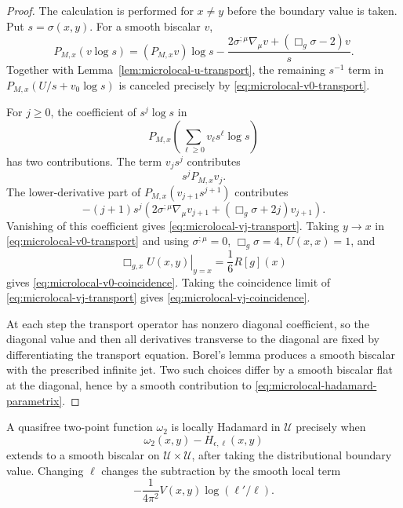 \begin{proof}
The calculation is performed for \(x\neq y\) before the boundary value is
taken.  Put \(s=\sigma(x,y)\).  For a smooth biscalar \(v\),
\begin{equation}
  P_{M,x}(v\log s)
  =
  (P_{M,x}v)\log s
  -
  \frac{
  2\sigma^{;\mu}\nabla_\mu v+(\Box_g\sigma-2)v
  }{s}.
  \label{eq:microlocal-p-v-log}
\end{equation}
Together with Lemma~\ref{lem:microlocal-u-transport}, the remaining
\(s^{-1}\) term in \(P_{M,x}(U/s+v_0\log s)\) is canceled precisely by
\eqref{eq:microlocal-v0-transport}.

For \(j\geq0\), the coefficient of \(s^j\log s\) in
\[
  P_{M,x}\left(\sum_{\ell\geq0}v_\ell s^\ell\log s\right)
\]
has two contributions.  The term \(v_j s^j\) contributes
\[
  s^jP_{M,x}v_j .
\]
The lower-derivative part of \(P_{M,x}(v_{j+1}s^{j+1})\) contributes
\begin{equation}
  -(j+1)s^j
  \left(
  2\sigma^{;\mu}\nabla_\mu v_{j+1}
  +(\Box_g\sigma+2j)v_{j+1}
  \right).
  \label{eq:microlocal-log-coefficient-step}
\end{equation}
Vanishing of this coefficient gives
\eqref{eq:microlocal-vj-transport}.  Taking \(y\to x\) in
\eqref{eq:microlocal-v0-transport} and using
\(\sigma^{;\mu}=0\), \(\Box_g\sigma=4\), \(U(x,x)=1\), and
\begin{equation}
  \left.\Box_{g,x}U(x,y)\right|_{y=x}=\frac16R[g](x)
  \label{eq:microlocal-box-u-coincidence}
\end{equation}
gives \eqref{eq:microlocal-v0-coincidence}.  Taking the coincidence limit of
\eqref{eq:microlocal-vj-transport} gives
\eqref{eq:microlocal-vj-coincidence}.

At each step the transport operator has nonzero diagonal coefficient, so the
diagonal value and then all derivatives transverse to the diagonal are fixed
by differentiating the transport equation.  Borel's lemma produces a smooth
biscalar with the prescribed infinite jet.  Two such choices differ by a
smooth biscalar flat at the diagonal, hence by a smooth contribution to
\eqref{eq:microlocal-hadamard-parametrix}.
\end{proof}

\begin{remark}
\label{rem:microlocal-hadamard-smooth-remainder}
A quasifree two-point function \(\omega_2\) is locally Hadamard in
\(\mathcal U\) precisely when
\begin{equation}
  \omega_2(x,y)-H_{\epsilon,\ell}(x,y)
  \label{eq:microlocal-hadamard-smooth-remainder}
\end{equation}
extends to a smooth biscalar on \(\mathcal U\times\mathcal U\), after taking
the distributional boundary value.  Changing \(\ell\) changes the subtraction
by the smooth local term
\begin{equation}
  -\frac{1}{4\pi^2}V(x,y)\log(\ell'/\ell).
  \label{eq:microlocal-hadamard-scale-change}
\end{equation}
\end{remark}


